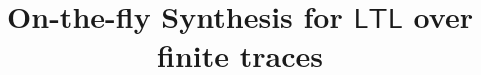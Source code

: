 \documentclass[letterpaper]{article} %
\newcommand{\ltl}{\textsf{LTL}\xspace}
\begin{document}
%

\title{On-the-fly Synthesis for $\ltl$ over finite traces}



\iffalse
\author{Jianwen Li, Kristin Y. Rozier\\ Iowa State University\\ Ames, IA, USA\\\{jianwen,kyrozier\}@iastate.edu 
\And Geguang Pu, Yueling Zhang\\ East China Normal University\\ Shanghai, China\\\{ggpu,ylzhang\}@sei.ecnu.edu.cn
\And Moshe Y. Vardi\\ Rice University\\ Houston, TX, USA\\ vardi@cs.rice.edu}
\fi

\maketitle
 


\begin{abstract}

\end{abstract}


%



%



%

%






\end{document}
